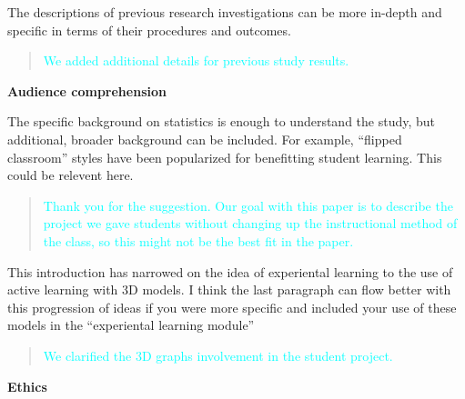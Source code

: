\documentclass[
  12pt,
  letterpaper,
  DIV=11,
  numbers=noendperiod]{scrartcl}
\begin{document}
The descriptions of previous research investigations can be more
in-depth and specific in terms of their procedures and outcomes.

\begin{quote}
\textcolor{cyan}{We added additional details for previous study results.}
\end{quote}

\textbf{Audience comprehension}

The specific background on statistics is enough to understand the study,
but additional, broader background can be included. For example,
``flipped classroom'' styles have been popularized for benefitting
student learning. This could be relevent here.

\begin{quote}
\textcolor{cyan}{Thank you for the suggestion. Our goal with this paper is to describe the project we gave students without changing up the instructional method of the class, so this might not be the best fit in the paper.}
\end{quote}

This introduction has narrowed on the idea of experiental learning to
the use of active learning with 3D models. I think the last paragraph
can flow better with this progression of ideas if you were more specific
and included your use of these models in the ``experiental learning
module''

\begin{quote}
\textcolor{cyan}{We clarified the 3D graphs involvement in the student project.}
\end{quote}

\textbf{Ethics}
\end{document}
